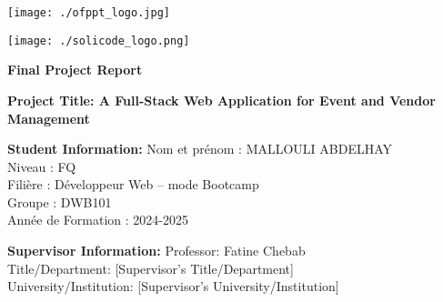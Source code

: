 \documentclass{report}
\begin{document}
\thispagestyle{empty} %

\noindent
\begin{minipage}[t]{0.5\textwidth} %
    \raggedright %
    \texttt{[image: ./ofppt\_logo.jpg]}
\end{minipage}
\hfill %
\begin{minipage}[t]{0.45\textwidth} %
    \raggedleft %
    \texttt{[image: ./solicode\_logo.png]} %
\end{minipage}

\vspace{1.5cm} %

\centering %
{\Huge\textbf{Final Project Report}}

\vspace{1.5cm}

{\Large\textbf{Project Title: A Full-Stack Web Application for Event and Vendor Management}}

\vspace{2cm}

\begin{flushleft} %
{\large\textbf{Student Information:}}
\vspace{0.3cm}
Nom et prénom : MALLOULI ABDELHAY\\
Niveau : FQ\\
Filière : Développeur Web – mode Bootcamp\\
Groupe : DWB101\\
Année de Formation : 2024-2025
\end{flushleft}

\vspace{1.5cm}

\begin{flushleft} %
{\large\textbf{Supervisor Information:}}
\vspace{0.3cm}
Professor: Fatine Chebab\\
Title/Department: [Supervisor's Title/Department]\\
University/Institution: [Supervisor's University/Institution]
\end{flushleft}
\end{document}
